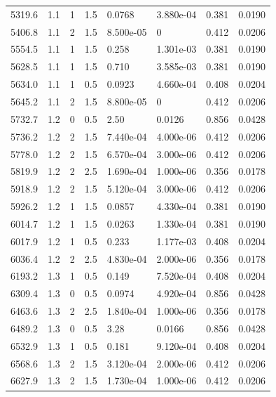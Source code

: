 \documentclass[preview]{standalone}
\begin{document}
{{{\begin{tabular}{L{1.2cm}C{1.2cm} C{0.3cm}C{0.5cm} C{1.4cm}C{1.4cm} C{1.4cm}C{1.4cm}}
  5319.6  &   1.1  & 1     & 1.5 &  0.0768  & 3.880e-04  & 0.381 &  0.0190   \\ 
  5406.8  &   1.1  & 2     & 1.5 &  8.500e-05  & 0  & 0.412 &  0.0206   \\ 
  5554.5  &   1.1  & 1     & 1.5 &  0.258  & 1.301e-03  & 0.381 &  0.0190   \\ 
  5628.5  &   1.1  & 1     & 1.5 &  0.710  & 3.585e-03  & 0.381 &  0.0190   \\ 
  5634.0  &   1.1  & 1     & 0.5 &  0.0923  & 4.660e-04  & 0.408 &  0.0204   \\ 
  5645.2  &   1.1  & 2     & 1.5 &  8.800e-05  & 0  & 0.412 &  0.0206   \\ 
  5732.7  &   1.2  & 0     & 0.5 &  2.50  & 0.0126  & 0.856 &  0.0428   \\ 
  5736.2  &   1.2  & 2     & 1.5 &  7.440e-04  & 4.000e-06  & 0.412 &  0.0206   \\ 
  5778.0  &   1.2  & 2     & 1.5 &  6.570e-04  & 3.000e-06  & 0.412 &  0.0206   \\ 
  5819.9  &   1.2  & 2     & 2.5 &  1.690e-04  & 1.000e-06  & 0.356 &  0.0178   \\ 
  5918.9  &   1.2  & 2     & 1.5 &  5.120e-04  & 3.000e-06  & 0.412 &  0.0206   \\ 
  5926.2  &   1.2  & 1     & 1.5 &  0.0857  & 4.330e-04  & 0.381 &  0.0190   \\ 
  6014.7  &   1.2  & 1     & 1.5 &  0.0263  & 1.330e-04  & 0.381 &  0.0190   \\ 
  6017.9  &   1.2  & 1     & 0.5 &  0.233  & 1.177e-03  & 0.408 &  0.0204   \\ 
  6036.4  &   1.2  & 2     & 2.5 &  4.830e-04  & 2.000e-06  & 0.356 &  0.0178   \\ 
  6193.2  &   1.3  & 1     & 0.5 &  0.149  & 7.520e-04  & 0.408 &  0.0204   \\ 
  6309.4  &   1.3  & 0     & 0.5 &  0.0974  & 4.920e-04  & 0.856 &  0.0428   \\ 
  6463.6  &   1.3  & 2     & 2.5 &  1.840e-04  & 1.000e-06  & 0.356 &  0.0178   \\ 
  6489.2  &   1.3  & 0     & 0.5 &  3.28  & 0.0166  & 0.856 &  0.0428   \\ 
  6532.9  &   1.3  & 1     & 0.5 &  0.181  & 9.120e-04  & 0.408 &  0.0204   \\ 
  6568.6  &   1.3  & 2     & 1.5 &  3.120e-04  & 2.000e-06  & 0.412 &  0.0206   \\ 
  6627.9  &   1.3  & 2     & 1.5 &  1.730e-04  & 1.000e-06  & 0.412 &  0.0206   \\ 

\end{tabular}}}}
\end{document}
